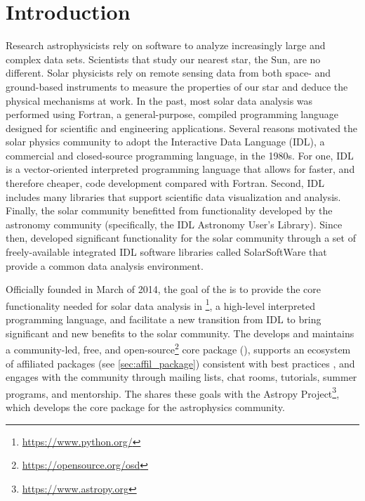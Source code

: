 \section{Introduction}
\label{sec:intro}

Research astrophysicists rely on software to analyze increasingly large and complex data sets.
Scientists that study our nearest star, the Sun, are no different.
Solar physicists rely on remote sensing data from both space- and ground-based instruments to measure the properties of our star and deduce the physical mechanisms at work.
In the past, most solar data analysis was performed using Fortran, a general-purpose, compiled programming language designed for scientific and engineering applications.
Several reasons motivated the solar physics community to adopt the Interactive Data Language (IDL), a commercial and closed-source programming language, in the 1980s.
For one, IDL is a vector-oriented interpreted programming language that allows for faster, and therefore cheaper, code development compared with Fortran.
Second, IDL includes many libraries that support scientific data visualization and analysis.
Finally, the solar community benefitted from functionality developed by the astronomy community (specifically, the IDL Astronomy User's Library).
Since then, \citep{Freeland:1998we} developed significant functionality for the solar community through a set of freely-available integrated IDL software libraries called SolarSoftWare that provide a common data analysis environment.

Officially founded in March of 2014, the goal of the \sunpyproj is to provide the core functionality needed for solar data analysis in \python\footnote{\url{https://www.python.org/}}, a high-level interpreted  programming language, and facilitate a new transition from IDL to bring significant and new benefits to the solar community.
The \sunpyproj develops and maintains a community-led, free, and open-source\footnote{\url{https://opensource.org/osd}} core \python package (\sunpypkg), supports an ecosystem of affiliated packages (see \autoref{sec:affil_package}) consistent with best practices \citep{Wilson:2014cka}, and engages with the community through mailing lists, chat rooms, tutorials, summer programs, and mentorship.
The \sunpyproj shares these goals with the Astropy Project\footnote{\url{https://www.astropy.org}}, which develops the \astropypkg core package \citep{astropy2018} for the astrophysics community.

